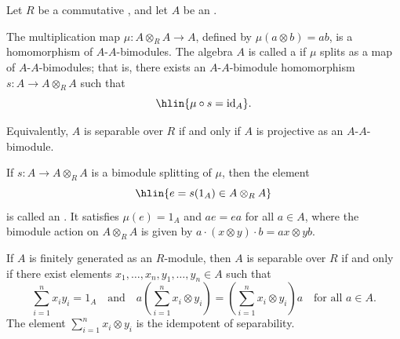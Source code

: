 \begin{definition} \label{definition:separable_algebra_over_a_commutative_ring}
    Let $R$ be a commutative , and let $A$ be an .

    The multiplication map $\mu: A \otimes_R A \to A$, defined by $\mu(a \otimes b) = ab$, is a homomorphism of $A$-$A$-bimodules. The algebra $A$ is called a  if $\mu$ splits as a map of $A$-$A$-bimodules; that is, there exists an $A$-$A$-bimodule homomorphism $s: A \to A \otimes_R A$ such that
    $$\hlin{\mu \circ s = \operatorname{id}_A}.$$

    Equivalently, $A$ is separable over $R$ if and only if $A$ is projective as an $A$-$A$-bimodule.

    If $s: A \to A \otimes_R A$ is a bimodule splitting of $\mu$, then the element
    $$\hlin{e = s(1_A) \in A \otimes_R A}$$
    is called an . It satisfies $\mu(e) = 1_A$ and $a e = e a$ for all $a \in A$, where the bimodule action on $A \otimes_R A$ is given by $a \cdot (x \otimes y) \cdot b = ax \otimes yb$.

    If $A$ is finitely generated as an $R$-module, then $A$ is separable over $R$ if and only if there exist elements $x_1, \ldots, x_n, y_1, \ldots, y_n \in A$ such that
    $$\sum_{i=1}^n x_i y_i = 1_A \quad \text{and} \quad a \left(\sum_{i=1}^n x_i \otimes y_i\right) = \left(\sum_{i=1}^n x_i \otimes y_i\right) a \quad \text{for all } a \in A.$$
    The element $\sum_{i=1}^n x_i \otimes y_i$ is the idempotent of separability.
\end{definition}

